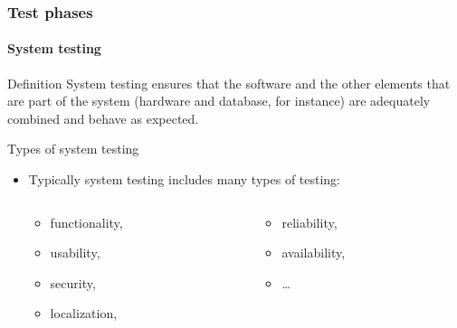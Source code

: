 \begin{frame}
\label{concept:system-testing}
\frametitle{Test phases}
\framesubtitle{System testing}

\begin{block:concept}{Definition}
System testing ensures that the software and the other elements that
are part of the system (hardware and database, for instance) are adequately
combined and behave as expected.
\end{block:concept}

\begin{block:fact}{Types of system testing}
\begin{itemize}
	\item Typically system testing includes many types of testing:
	\begin{columns}[t, totalwidth=6.5cm]
		\begin{column}[t]{3cm}
			\begin{itemize}
				\item functionality,
				\item usability,
				\item security,
				\item localization,
			\end{itemize}
		\end{column}

		\begin{column}[t]{3cm}
			\begin{itemize}
				\item reliability,
				\item availability,
				\item \ldots
			\end{itemize}
		\end{column}
	\end{columns}
\end{itemize}
\end{block:fact}

\hfill
{}
\end{frame}



